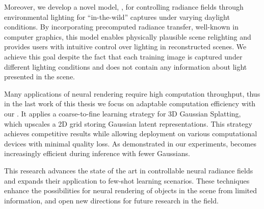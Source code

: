 {  Moreover, we develop a novel model, \lumigauss, for controlling radiance
  fields through environmental lighting for ``in-the-wild'' captures under
  varying daylight conditions.
  By incorporating precomputed radiance transfer, well-known in computer
  graphics, this model enables physically plausible scene relighting and
  provides users with intuitive control over lighting in reconstructed scenes.
  We achieve this goal despite the fact that each training image is captured
  under different lighting conditions and does not contain any information about
  light presented in the scene.

  Many applications of neural rendering require high computation throughput,
  thus in the last work of this thesis we focus on adaptable computation
  efficiency with our \clog.
  It applies a coarse-to-fine learning strategy for 3D Gaussian Splatting, which
  upscales a 2D grid storing Gaussian latent representations.
  This strategy achieves competitive results while allowing deployment on
  various computational devices with minimal quality loss.
  As demonstrated in our experiments, \clog becomes increasingly efficient
  during inference with fewer Gaussians.

  This research advances the state of the art in controllable neural radiance
  fields and expands their application to few-shot learning scenarios.
  These techniques enhance the possibilities for neural rendering of objects in
  the scene from limited information, and open new directions for future
  research in the field.
}


